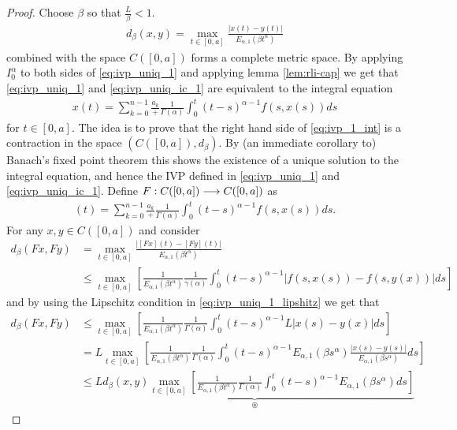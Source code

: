 \begin{proof}
	Choose $ \beta $ so that $ \frac{L}{\beta} < 1 $.
	\begin{align}
		d_\beta(x,y) = \max_{t \in [0,a]} \frac{|x(t) - y(t)|}{E_{\alpha,1}(\beta t^\alpha)}
	\end{align}
	combined with the space $ C([0,a]) $ forms a complete metric space. By applying $ I_0^\alpha $ to both sides of \eqref{eq:ivp_uniq_1} and applying lemma \ref{lem:rli-cap} we get that \eqref{eq:ivp_uniq_1} and \eqref{eq:ivp_uniq_ic_1} are equivalent to the integral equation
	\begin{align}
		\label{eq:ivp_1_int}
		x(t) = \sum_{k=0}^{n-1} \frac{a_k} + \frac{1}{\Gamma(\alpha)} \int_0^t (t-s)^{\alpha-1}f(s,x(s))ds
	\end{align}
	for $ t \in [0,a] $.
	The idea is to prove that the right hand side of \eqref{eq:ivp_1_int} is a contraction in the space $ (C([0,a]),d_\beta) $. By (an immediate corollary to) Banach's fixed point theorem this shows the existence of a unique solution to the integral equation, and hence the IVP defined in \eqref{eq:ivp_uniq_1} and \eqref{eq:ivp_uniq_ic_1}.
	Define $ F : C([0,a]) \longrightarrow C([0,a]) $
	as
	\begin{align}
		[Fx](t) = \sum_{k=0}^{n-1} \frac{a_k} + \frac{1}{\Gamma(\alpha)} \int_0^t (t-s)^{\alpha-1}f(s,x(s))ds.
	\end{align}
	For any $ x, y \in C([0,a]) $ and consider
	\begin{align}
		d_\beta(Fx,Fy) &= \max_{t\in[0,a]} \frac{|[Fx](t) - [Fy](t)|}{E_{\alpha,1}(\beta t^\alpha)} \\
			&\leq \max_{t\in[0,a]} \left[ \frac{1}{E_{\alpha,1}(\beta t^\alpha)} \frac{1}{\gamma(\alpha)} \int_0^t (t-s)^{\alpha-1}| f(s,x(s)) - f(s,y(x))|ds  \right]
	\end{align}
	and by using the Lipschitz condition in \eqref{eq:ivp_uniq_1_lipshitz} we get that
	\begin{align}
		d_\beta(Fx,Fy) &\leq \max_{t\in[0,a]} \left[ \frac{1}{E_{\alpha,1}(\beta t^\alpha)} \frac{1}{\Gamma(\alpha)} \int_0^t (t-s)^{\alpha-1}L| x(s) - y(x)|ds  \right] \\
		&= L  \max_{t\in[0,a]} \left[ \frac{1}{E_{\alpha,1}(\beta t^\alpha)} \frac{1}{\Gamma(\alpha)} \int_0^t (t-s)^{\alpha - 1} E_{\alpha,1}(\beta s^\alpha) \frac{|x(s) - y(s)|}{E_{\alpha,1}(\beta s^\alpha)} ds \right] \\
		&\leq \underbrace{L d_\beta(x,y) \max_{t\in [0,a]} \left[ \frac{1}{E_{\alpha,1}(\beta t^\alpha)}\frac{1}{\Gamma(\alpha)} \int_0^t (t-s)^{\alpha-1} E_{\alpha,1}(\beta s^\alpha) ds\right]}_{\circledast}

\end{align}
\end{proof}
